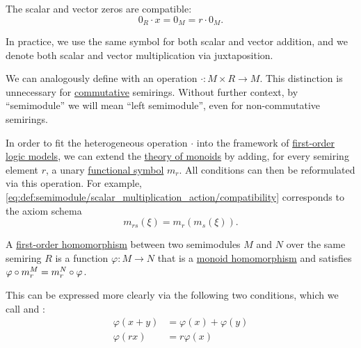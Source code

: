 \begin{definition}
\begin{thmenum}
     The scalar and vector zeros are compatible:
    \begin{equation}\label{eq:def:semimodule/absorption}
      0_R \cdot x = 0_M = r \cdot 0_M.
    \end{equation}
  \end{thmenum}

  In practice, we use the same symbol for both scalar and vector addition, and we denote both scalar and vector multiplication via juxtaposition.

  We can analogously define  with an operation \( \cdot: M \times R \to M \). This distinction is unnecessary for \hyperref[def:magma/commutative]{commutative} semirings. Without further context, by \enquote{semimodule} we will mean \enquote{left semimodule}, even for non-commutative semirings.

  \begin{thmenum}
     In order to fit the heterogeneous operation \( \cdot \) into the framework of \hyperref[def:first_order_semantics/satisfiability]{first-order logic models}, we can extend the \hyperref[def:monoid/theory]{theory of monoids} by adding, for every semiring element \( r \), a unary \hyperref[def:first_order_language/func]{functional symbol} \( m_r \). All conditions can then be reformulated via this operation. For example, \eqref{eq:def:semimodule/scalar_multiplication_action/compatibility} corresponds to the axiom schema
    \begin{equation*}
      m_{rs}(\xi) = m_r(m_s(\xi)).
    \end{equation*}

     A \hyperref[def:first_order_homomorphism]{first-order homomorphism} between two semimodules \( M \) and \( N \) over the same semiring \( R \) is a function \( \varphi: M \to N \) that is a \hyperref[def:monoid/homomorphism]{monoid homomorphism} and satisfies \( \varphi \bincirc m_r^M = m_r^N \bincirc \varphi \).

    This can be expressed more clearly via the following two conditions, which we call  and :
    \begin{align}
      \varphi(x + y) &= \varphi(x) + \varphi(y) \label{def:semimodule/homomorphism/additive} \\
         \varphi(rx) &= r \varphi(x) \label{def:semimodule/homomorphism/homogeneity}
    \end{align}


\end{thmenum}
\end{definition}
